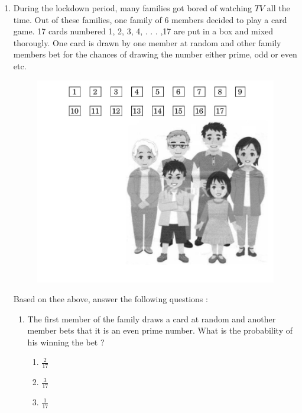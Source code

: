 %
\begin{enumerate}[label=\thesection.\arabic*.,ref=\thesection.\theenumi]
\item During the lockdown period, many families got bored of watching $ TV $ all the time. Out of these families, 
 one family of 6 members decided to play a card game. 17 cards numbered 1, 2, 3, 4, . . . ,17 are put in a box 
 and mixed thorougly. One card is drawn by one member at random and other family members bet for the chances 
 of drawing the number either prime, odd or even etc.
		\begin{figure}[H]
			\centering
			\includegraphics[width=\columnwidth]{figs/linear.jpg}
			\caption{}
			\label{fig}
		\end{figure}
		Based on thee above, answer the following questions : 
		\begin{enumerate}
			\item The first member of the family draws a card at random and another member bets that 
				it is an even prime number. What is the probability of his winning the bet ?
				\begin{enumerate}
					\item $ \frac{2}{17} $
					\item $ \frac{3}{17} $
					\item $ \frac{1}{17} $

\end{enumerate}
\end{enumerate}
\end{enumerate}
